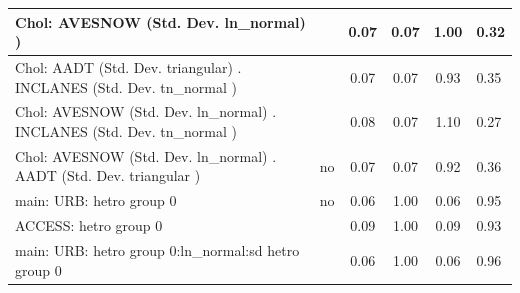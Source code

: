 \begin{table}
\begin{center}
\begin{tabular}{|l|l|c|c|c|l|}
			 Chol: AVESNOW (Std. Dev. ln_normal) ) &  & 0.07 & 0.07 & 1.00 & 0.32 \\
			\hline
			 Chol: AADT (Std. Dev. triangular) . INCLANES (Std. Dev.   tn_normal ) &  & 0.07 & 0.07 & 0.93 & 0.35 \\
			\hline
			 Chol: AVESNOW (Std. Dev. ln_normal) . INCLANES (Std. Dev.   tn_normal ) &  & 0.08 & 0.07 & 1.10 & 0.27 \\
			\hline
			 Chol: AVESNOW (Std. Dev. ln_normal) . AADT (Std. Dev.   triangular ) & no & 0.07 & 0.07 & 0.92 & 0.36 \\
			\hline
			main: URB: hetro group 0 & no & 0.06 & 1.00 & 0.06 & 0.95 \\
			\hline
			ACCESS: hetro group 0 &  & 0.09 & 1.00 & 0.09 & 0.93 \\
			\hline
			main: URB: hetro group 0:ln_normal:sd  hetro group 0 &  & 0.06 & 1.00 & 0.06 & 0.96 \\
			\hline
		\end{tabular}
	\end{center}
\end{table}